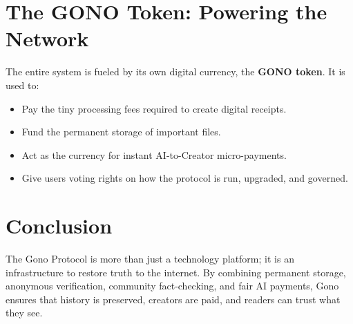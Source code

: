 \documentclass[12pt, a4paper]{article}
\begin{document}
\section{The GONO Token: Powering the Network}

The entire system is fueled by its own digital currency, the \textbf{GONO token}. It is used to:

\begin{itemize}[leftmargin=*]
    \item Pay the tiny processing fees required to create digital receipts.
    \item Fund the permanent storage of important files.
    \item Act as the currency for instant AI-to-Creator micro-payments.
    \item Give users voting rights on how the protocol is run, upgraded, and governed.
\end{itemize}

\section{Conclusion}

The Gono Protocol is more than just a technology platform; it is an infrastructure to restore truth to the internet. By combining permanent storage, anonymous verification, community fact-checking, and fair AI payments, Gono ensures that history is preserved, creators are paid, and readers can trust what they see.
\end{document}
